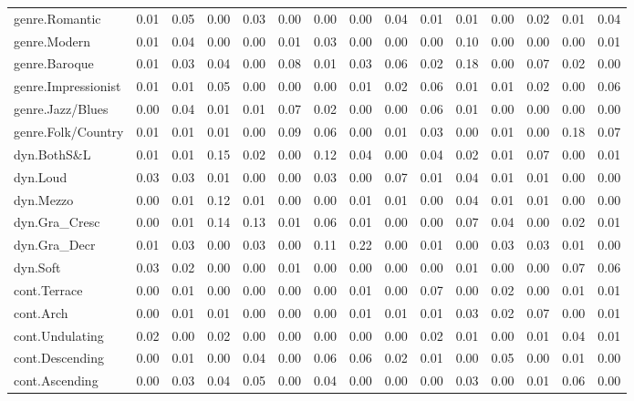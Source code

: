 \documentclass[
]{article}
\newenvironment{lltable}{\begin{landscape}\begin{center}\begin{ThreePartTable}}{\end{ThreePartTable}\end{center}\end{landscape}}
\begin{document}
\begin{lltable}
{\begin{longtable}{lllllllllllllll}
genre.Romantic & 0.01 & 0.05 & 0.00 & 0.03 & 0.00 & 0.00 & 0.00 & 0.04 & 0.01 & 0.01 & 0.00 & 0.02 & 0.01 & 0.04\\
genre.Modern & 0.01 & 0.04 & 0.00 & 0.00 & 0.01 & 0.03 & 0.00 & 0.00 & 0.00 & 0.10 & 0.00 & 0.00 & 0.00 & 0.01\\
genre.Baroque & 0.01 & 0.03 & 0.04 & 0.00 & 0.08 & 0.01 & 0.03 & 0.06 & 0.02 & 0.18 & 0.00 & 0.07 & 0.02 & 0.00\\
genre.Impressionist & 0.01 & 0.01 & 0.05 & 0.00 & 0.00 & 0.00 & 0.01 & 0.02 & 0.06 & 0.01 & 0.01 & 0.02 & 0.00 & 0.06\\
genre.Jazz/Blues & 0.00 & 0.04 & 0.01 & 0.01 & 0.07 & 0.02 & 0.00 & 0.00 & 0.06 & 0.01 & 0.00 & 0.00 & 0.00 & 0.00\\
genre.Folk/Country & 0.01 & 0.01 & 0.01 & 0.00 & 0.09 & 0.06 & 0.00 & 0.01 & 0.03 & 0.00 & 0.01 & 0.00 & 0.18 & 0.07\\
dyn.BothS\&L & 0.01 & 0.01 & 0.15 & 0.02 & 0.00 & 0.12 & 0.04 & 0.00 & 0.04 & 0.02 & 0.01 & 0.07 & 0.00 & 0.01\\
dyn.Loud & 0.03 & 0.03 & 0.01 & 0.00 & 0.00 & 0.03 & 0.00 & 0.07 & 0.01 & 0.04 & 0.01 & 0.01 & 0.00 & 0.00\\
dyn.Mezzo & 0.00 & 0.01 & 0.12 & 0.01 & 0.00 & 0.00 & 0.01 & 0.01 & 0.00 & 0.04 & 0.01 & 0.01 & 0.00 & 0.00\\
dyn.Gra\_Cresc & 0.00 & 0.01 & 0.14 & 0.13 & 0.01 & 0.06 & 0.01 & 0.00 & 0.00 & 0.07 & 0.04 & 0.00 & 0.02 & 0.01\\
dyn.Gra\_Decr & 0.01 & 0.03 & 0.00 & 0.03 & 0.00 & 0.11 & 0.22 & 0.00 & 0.01 & 0.00 & 0.03 & 0.03 & 0.01 & 0.00\\
dyn.Soft & 0.03 & 0.02 & 0.00 & 0.00 & 0.01 & 0.00 & 0.00 & 0.00 & 0.00 & 0.01 & 0.00 & 0.00 & 0.07 & 0.06\\
cont.Terrace & 0.00 & 0.01 & 0.00 & 0.00 & 0.00 & 0.00 & 0.01 & 0.00 & 0.07 & 0.00 & 0.02 & 0.00 & 0.01 & 0.01\\
cont.Arch & 0.00 & 0.01 & 0.01 & 0.00 & 0.00 & 0.00 & 0.01 & 0.01 & 0.01 & 0.03 & 0.02 & 0.07 & 0.00 & 0.01\\
cont.Undulating & 0.02 & 0.00 & 0.02 & 0.00 & 0.00 & 0.00 & 0.00 & 0.00 & 0.02 & 0.01 & 0.00 & 0.01 & 0.04 & 0.01\\
cont.Descending & 0.00 & 0.01 & 0.00 & 0.04 & 0.00 & 0.06 & 0.06 & 0.02 & 0.01 & 0.00 & 0.05 & 0.00 & 0.01 & 0.00\\
cont.Ascending & 0.00 & 0.03 & 0.04 & 0.05 & 0.00 & 0.04 & 0.00 & 0.00 & 0.00 & 0.03 & 0.00 & 0.01 & 0.06 & 0.00\\

\end{longtable}}
\end{lltable}
\end{document}

